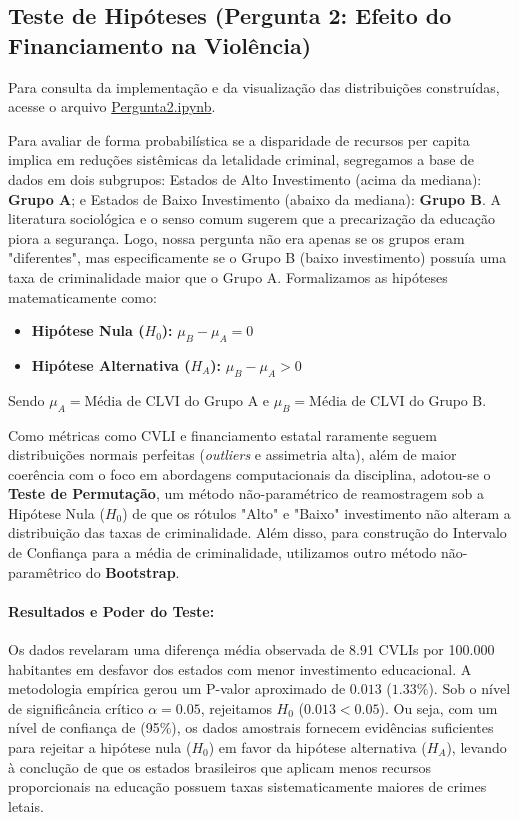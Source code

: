 \documentclass[10pt]{article}
\begin{document}
\subsection{Teste de Hipóteses (Pergunta 2: Efeito do Financiamento na Violência)}

Para consulta da implementação e da visualização das distribuições construídas, acesse o arquivo \href{https://colab.research.google.com/drive/1dT2fBm92cKXEZFFhQeh7Xt-DvyE9x9aO#scrollTo=7e053f8b-1a88-4c0c-a0c7-7ba926015c9e}{Pergunta2.ipynb}.

Para avaliar de forma probabilística se a disparidade de recursos per capita implica em reduções sistêmicas da letalidade criminal, segregamos a base de dados em dois subgrupos: Estados de Alto Investimento (acima da mediana): \textbf{Grupo A}; e Estados de Baixo Investimento (abaixo da mediana): \textbf{Grupo B}. A literatura sociológica e o senso comum sugerem que a precarização da educação piora a segurança. Logo, nossa pergunta não era apenas se os grupos eram "diferentes", mas especificamente se o Grupo B (baixo investimento) possuía uma taxa de criminalidade maior que o Grupo A. Formalizamos as hipóteses matematicamente como:
\begin{itemize}
    \item \textbf{Hipótese Nula ($H_{0}$):} $\mu_{B} - \mu_{A} = 0$
    \item \textbf{Hipótese Alternativa ($H_{A}$):} $\mu_{B} - \mu_{A} > 0$
\end{itemize}

Sendo $\mu_{A} = \text{Média de CLVI do Grupo A}$ e $\mu_{B} = \text{Média de CLVI do Grupo B}$.

Como métricas como CVLI e financiamento estatal raramente seguem distribuições normais perfeitas (\textit{outliers} e assimetria alta), além de maior coerência com o foco em abordagens computacionais da disciplina, adotou-se o \textbf{Teste de Permutação}, um método não-paramétrico de reamostragem sob a Hipótese Nula ($H_0$) de que os rótulos "Alto" e "Baixo" investimento não alteram a distribuição das taxas de criminalidade. Além disso, para construção do Intervalo de Confiança para a média de criminalidade, utilizamos outro método não-paramêtrico do \textbf{Bootstrap}.

\paragraph{Resultados e Poder do Teste:}
Os dados revelaram uma diferença média observada de 8.91 CVLIs por 100.000 habitantes em desfavor dos estados com menor investimento educacional. A metodologia empírica gerou um P-valor aproximado de $0.013$ ($1.33\%$). Sob o nível de significância crítico $\alpha = 0.05$, rejeitamos $H_0$ ($0.013 < 0.05$). Ou seja, com um nível de confiança de (95\%), os dados amostrais fornecem evidências suficientes para rejeitar a hipótese nula ($H_{0}$) em favor da hipótese alternativa ($H_{A}$), levando à conclução de que os estados brasileiros que aplicam menos recursos proporcionais na educação possuem taxas sistematicamente maiores de crimes letais.
\end{document}
